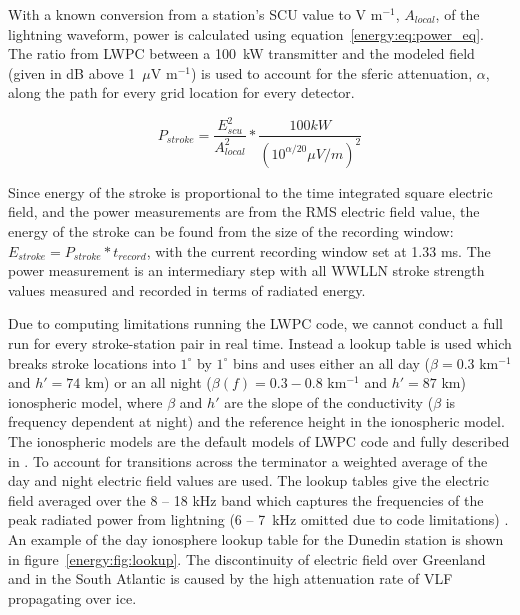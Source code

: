 With a known conversion from a station's SCU value to V m$^{-1}$, $A_{local}$, of the lightning waveform, power is calculated using equation~\ref{energy:eq:power_eq}.
The ratio from LWPC between a 100~kW transmitter and the modeled field (given in dB above 1~$\mu$V m$^{-1}$) is used to account for the sferic attenuation, $\alpha$, along the path for every grid location for every detector.

\begin{equation}
P_{stroke}=\frac{E_{scu}^2}{A_{local}^2} * \frac{100kW}{(10^{\alpha/20}\mu V/m)^2}
\label{energy:eq:power_eq}
\end{equation}

Since energy of the stroke is proportional to the time integrated square electric field, and the power measurements are from the RMS electric field value, the energy of the stroke can be found from the size of the recording window: $E_{stroke}=P_{stroke} * t_{record}$, with the current recording window set at 1.33 ms.
The power measurement is an intermediary step with all WWLLN stroke strength values measured and recorded in terms of radiated energy.

Due to computing limitations running the LWPC code, we cannot conduct a full run for every stroke-station pair in real time.
Instead a lookup table is used which breaks stroke locations into $1^{\circ}$ by $1^{\circ}$ bins and uses either an all day ($\beta=0.3$ km$^{-1}$ and $h'=74$ km) or an all night ($\beta(f)=0.3-0.8$ km$^{-1}$ and $h'=87$ km) ionospheric model, where $\beta$ and $h'$ are the slope of the conductivity ($\beta$ is frequency dependent at night) and the reference height in the ionospheric model.
The ionospheric models are the default models of LWPC code and fully described in \citet{Ferguson1998}. 
To account for transitions across the terminator a weighted average of the day and night electric field values are used.
The lookup tables give the electric field averaged over the 8 -- 18 kHz band which captures the frequencies of the peak radiated power from lightning (6 -- 7~kHz omitted due to code limitations) \citep{Volland1995}.
An example of the day ionosphere lookup table for the Dunedin station is shown in figure~\ref{energy:fig:lookup}.
The discontinuity of electric field over Greenland and in the South Atlantic is caused by the high attenuation rate of VLF propagating over ice.

